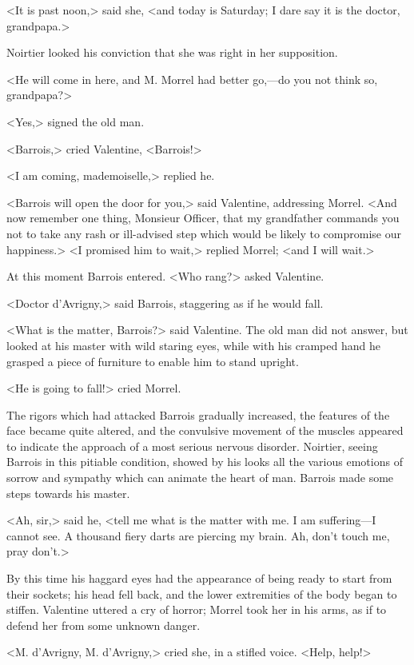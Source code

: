  <It is past noon,> said she, <and today is Saturday; I dare say it is the doctor, grandpapa.> 

 Noirtier looked his conviction that she was right in her supposition. 

 <He will come in here, and M. Morrel had better go,—do you not think so, grandpapa?> 

 <Yes,> signed the old man. 

 <Barrois,> cried Valentine, <Barrois!> 

 <I am coming, mademoiselle,> replied he. 

 <Barrois will open the door for you,> said Valentine, addressing Morrel. <And now remember one thing, Monsieur Officer, that my grandfather commands you not to take any rash or ill-advised step which would be likely to compromise our happiness.>  <I promised him to wait,> replied Morrel; <and I will wait.> 

 At this moment Barrois entered. <Who rang?> asked Valentine. 

 <Doctor d'Avrigny,> said Barrois, staggering as if he would fall. 

 <What is the matter, Barrois?> said Valentine. The old man did not answer, but looked at his master with wild staring eyes, while with his cramped hand he grasped a piece of furniture to enable him to stand upright. 

 <He is going to fall!> cried Morrel. 

 The rigors which had attacked Barrois gradually increased, the features of the face became quite altered, and the convulsive movement of the muscles appeared to indicate the approach of a most serious nervous disorder. Noirtier, seeing Barrois in this pitiable condition, showed by his looks all the various emotions of sorrow and sympathy which can animate the heart of man. Barrois made some steps towards his master. 

 <Ah, sir,> said he, <tell me what is the matter with me. I am suffering—I cannot see. A thousand fiery darts are piercing my brain. Ah, don't touch me, pray don't.> 

 By this time his haggard eyes had the appearance of being ready to start from their sockets; his head fell back, and the lower extremities of the body began to stiffen. Valentine uttered a cry of horror; Morrel took her in his arms, as if to defend her from some unknown danger. 

 <M. d'Avrigny, M. d'Avrigny,> cried she, in a stifled voice. <Help, help!> 

